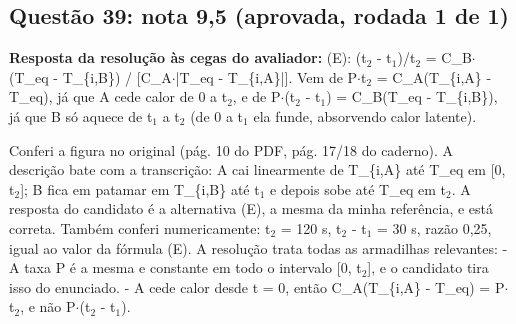 \documentclass{article}%
\begin{document}
\subsection*{Questão 39: nota 9,5 (aprovada, rodada 1 de 1)}%
\textbf{Resposta da resolução às cegas do avaliador:} (E): (t$_{2}$ - t$_{1}$)/t$_{2}$ = C\_B$\cdot$(T\_eq - T\_\{i,B\}) / {[}C\_A$\cdot$|T\_eq - T\_\{i,A\}|{]}. Vem de P$\cdot$t$_{2}$ = C\_A(T\_\{i,A\} - T\_eq), já que A cede calor de 0 a t$_{2}$, e de P$\cdot$(t$_{2}$ - t$_{1}$) = C\_B(T\_eq - T\_\{i,B\}), já que B só aquece de t$_{1}$ a t$_{2}$ (de 0 a t$_{1}$ ela funde, absorvendo calor latente).\par %
Conferi a figura no original (pág. 10 do PDF, pág. 17/18 do caderno). A descrição bate com a transcrição: A cai linearmente de T\_\{i,A\} até T\_eq em {[}0, t$_{2}${]}; B fica em patamar em T\_\{i,B\} até t$_{1}$ e depois sobe até T\_eq em t$_{2}$. A resposta do candidato é a alternativa (E), a mesma da minha referência, e está correta. Também conferi numericamente: t$_{2}$ = 120 s, t$_{2}$ - t$_{1}$ = 30 s, razão 0,25, igual ao valor da fórmula (E).\newline%
\newline%
A resolução trata todas as armadilhas relevantes:\newline%
{-} A taxa P é a mesma e constante em todo o intervalo {[}0, t$_{2}${]}, e o candidato tira isso do enunciado.\newline%
{-} A cede calor desde t = 0, então C\_A(T\_\{i,A\} - T\_eq) = P$\cdot$t$_{2}$, e não P$\cdot$(t$_{2}$ - t$_{1}$).\newline%
\end{document}
